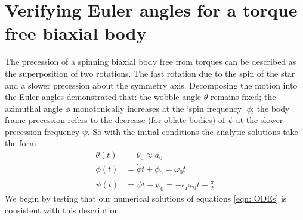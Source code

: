 \documentclass[../full_thesis/full_thesis.tex]{subfiles}
\begin{document}
\section{Verifying Euler angles for a torque free biaxial body}

The precession of a spinning biaxial body free from torques can be described as
the superposition of two rotations.  The fast rotation due to the spin of the
star and a slower precession about the symmetry axis. Decomposing the motion
into the Euler angles \citet{Jones2001} demonstrated that: the wobble angle
$\theta$ remains fixed; the azimuthal angle $\phi$ monotonically increases at
the `spin frequency' $\dot{\phi}$; the body frame precession refers to the
decrease (for oblate bodies) of $\psi$ at the slower precession frequency
$\dot{\psi}$. So with the initial conditions the analytic solutions take
the form
\begin{align}
    \theta(t) & = \theta_{0} \approx a_{0} \\
    \phi(t) & = \dot{\phi}t + \phi_{0} = \omega_{0} t \\
    \psi(t) & = \dot{\psi}t + \psi_{0}= -\epsilon_{I}\omega_{0}t+\frac{\pi}{2}
    \label{eqn: euler angles torque free evolution}
\end{align}
We begin by testing that our numerical solutions of equations
\eqref{eqn: ODEs} is consistent with this description.
\end{document}
